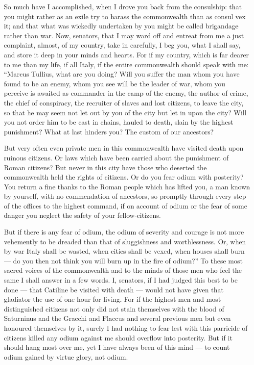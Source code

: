  So much have I accomplished, when I drove you back from the consulship: that you might rather as an exile try to harass the commonwealth than as consul vex it; and that what was wickedly undertaken by you might be called brigandage rather than war. Now, senators, that I may ward off and entreat from me a just complaint, almost, of my country, take in carefully, I beg you, what I shall say, and store it deep in your minds and hearts. For if my country, which is far dearer to me than my life, if all Italy, if the entire commonwealth should speak with me: ``Marcus Tullius, what are you doing? Will you suffer the man whom you have found to be an enemy, whom you see will be the leader of war, whom you perceive is awaited as commander in the camp of the enemy, the author of crime, the chief of conspiracy, the recruiter of slaves and lost citizens, to leave the city, so that he may seem not let out by you of the city but let in upon the city? Will you not order him to be cast in chains, hauled to death, slain by the highest punishment? What at last hinders you? The custom of our ancestors?

 But very often even private men in this commonwealth have visited death upon ruinous citizens. Or laws which have been carried about the punishment of Roman citizens? But never in this city have those who deserted the commonwealth held the rights of citizens. Or do you fear odium with posterity? You return a fine thanks to the Roman people which has lifted you, a man known by yourself, with no commendation of ancestors, so promptly through every step of the offices to the highest command, if on account of odium or the fear of some danger you neglect the safety of your fellow-citizens.

 But if there is any fear of odium, the odium of severity and courage is not more vehemently to be dreaded than that of sluggishness and worthlessness. Or, when by war Italy shall be wasted, when cities shall be vexed, when houses shall burn --- do you then not think you will burn up in the fire of odium?'' To these most sacred voices of the commonwealth and to the minds of those men who feel the same I shall answer in a few words. I, senators, if I had judged this best to be done --- that Catiline be visited with death --- would not have given that gladiator the use of one hour for living. For if the highest men and most distinguished citizens not only did not stain themselves with the blood of Saturninus and the Gracchi and Flaccus and several previous men but even honoured themselves by it, surely I had nothing to fear lest with this parricide of citizens killed any odium against me should overflow into posterity. But if it should hang most over me, yet I have always been of this mind --- to count odium gained by virtue glory, not odium.

